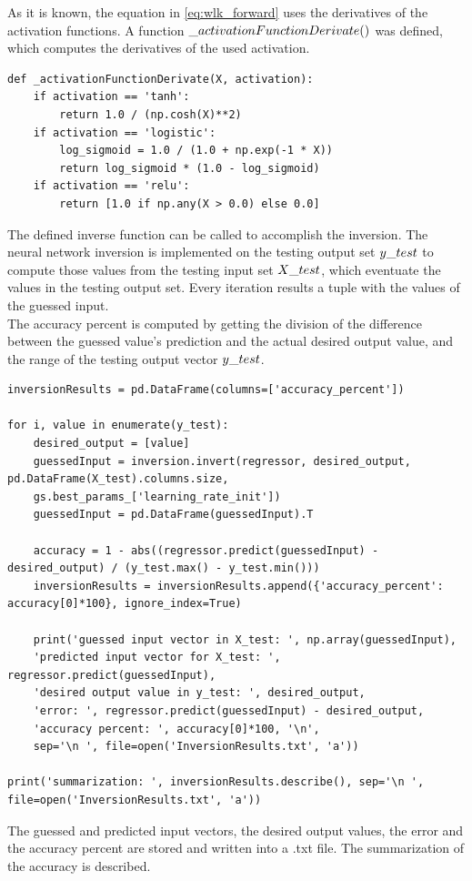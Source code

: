 \medskip As it is known, the equation in \eqref{eq:wlk_forward} uses the derivatives of the activation functions. A function $\char`_activationFunctionDerivate()$ was defined, which computes the derivatives of the used activation.
\begin{lstlisting}
def _activationFunctionDerivate(X, activation):
	if activation == 'tanh':
		return 1.0 / (np.cosh(X)**2)
	if activation == 'logistic':
		log_sigmoid = 1.0 / (1.0 + np.exp(-1 * X))
		return log_sigmoid * (1.0 - log_sigmoid)
	if activation == 'relu':
		return [1.0 if np.any(X > 0.0) else 0.0]
\end{lstlisting}

\medskip The defined inverse function can be called to accomplish the inversion. The neural network inversion is implemented on the testing output set $y\char`_test$ to compute those values from the testing input set $X\char`_test$, which eventuate the values in the testing output set. Every iteration results a tuple with the values of the guessed input.\\
The accuracy percent is computed by getting the division of the difference between the guessed value's prediction and the actual desired output value, and the range of the testing output vector $y\char`_test$. 
\begin{lstlisting}
inversionResults = pd.DataFrame(columns=['accuracy_percent'])

for i, value in enumerate(y_test):
	desired_output = [value]
	guessedInput = inversion.invert(regressor, desired_output, pd.DataFrame(X_test).columns.size,
	gs.best_params_['learning_rate_init'])
	guessedInput = pd.DataFrame(guessedInput).T

	accuracy = 1 - abs((regressor.predict(guessedInput) - desired_output) / (y_test.max() - y_test.min()))
	inversionResults = inversionResults.append({'accuracy_percent': accuracy[0]*100}, ignore_index=True)

	print('guessed input vector in X_test: ', np.array(guessedInput),
	'predicted input vector for X_test: ', regressor.predict(guessedInput),
	'desired output value in y_test: ', desired_output,
	'error: ', regressor.predict(guessedInput) - desired_output,
	'accuracy percent: ', accuracy[0]*100, '\n',
	sep='\n ', file=open('InversionResults.txt', 'a'))

print('summarization: ', inversionResults.describe(), sep='\n ', file=open('InversionResults.txt', 'a'))
\end{lstlisting}
The guessed and predicted input vectors, the desired output values, the error and the accuracy percent are stored and written into a .txt file. The summarization of the accuracy is described.


